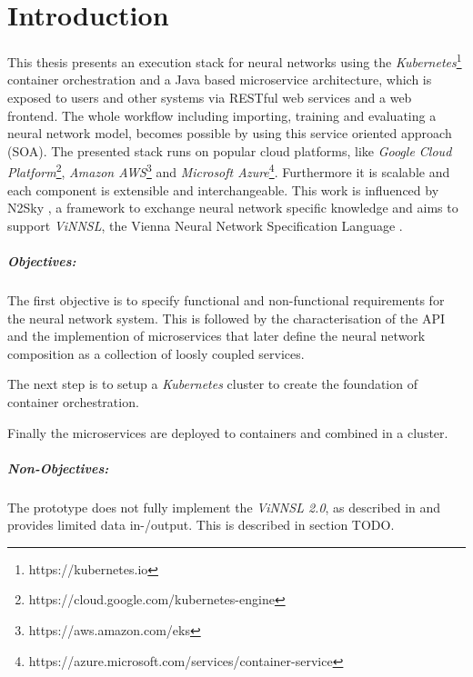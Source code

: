 \chapter{Introduction}\label{introduction}

This thesis presents an execution stack for neural networks using the
\emph{Kubernetes}\footnote{https://kubernetes.io} container
orchestration and a Java based microservice architecture, which is
exposed to users and other systems via RESTful web services and a web
frontend. The whole workflow including importing, training and
evaluating a neural network model, becomes possible by using this
service oriented approach (SOA). The presented stack runs on popular
cloud platforms, like \emph{Google Cloud Platform}\footnote{https://cloud.google.com/kubernetes-engine},
\emph{Amazon AWS}\footnote{https://aws.amazon.com/eks} and
\emph{Microsoft Azure}\footnote{https://azure.microsoft.com/services/container-service}.
Furthermore it is scalable and each component is extensible and
interchangeable. This work is influenced by N2Sky \cite{schikuta_2013},
a framework to exchange neural network specific knowledge and aims to
support \emph{ViNNSL}, the Vienna Neural Network Specification Language
\cite{kopica_2015} \cite{beran_2008}.

\paragraph{Objectives:}\label{objectives}

The first objective is to specify functional and non-functional
requirements for the neural network system. This is followed by the
characterisation of the API and the implemention of microservices that
later define the neural network composition as a collection of loosly
coupled services.

The next step is to setup a \emph{Kubernetes} cluster to create the
foundation of container orchestration.

Finally the microservices are deployed to containers and combined in a
cluster.

\paragraph{Non-Objectives:}\label{non-objectives}

The prototype does not fully implement the \emph{ViNNSL 2.0}, as
described in \cite{kopica_2015} and provides limited data in-/output.
This is described in section TODO.


